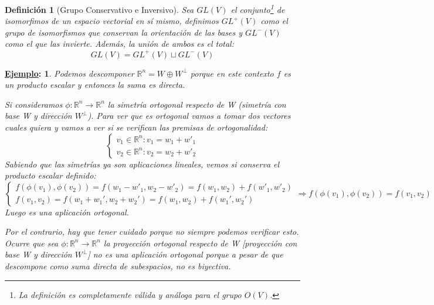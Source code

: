 \documentclass[10pt,a4paper,openright]{book}
\theoremstyle{break}
\newtheorem*{defi}{Definición}
\newtheorem*{ej}{\underline{Ejemplo}:}
\begin{document}
\begin{defi}[Grupo Conservativo e Inversivo]
Sea $GL(V)$ el conjunto\footnote{La definición es completamente válida y análoga para el grupo $O(V)$.} de isomorfimos de un espacio vectorial en sí mismo, definimos $GL^+(V)$ como el grupo de isomorfismos que conservan la orientación de las bases y $GL^-(V)$ como el que las invierte. Además, la unión de ambos es el total:
$$GL(V) = GL^+ (V) \sqcup GL^- (V)$$
\end{defi}

\begin{ej}
Podemos descomponer $\mathbb{R}^n = W \oplus W^\perp$ porque en este contexto $f$ es un producto escalar y entonces la suma es directa.

Si consideramos $\phi:\mathbb{R}^n  \to \mathbb{R}^n$ la simetría ortogonal respecto de W (simetría con base W y dirección $W^\perp$). Para ver que es ortogonal vamos a tomar dos vectores cuales quiera y vamos a ver si se verifican las premisas de ortogonalidad:
$$\begin{cases} v_1 \in \mathbb{R}^n : v_1 = w_1 + w'_1 \\ v_2 \in \mathbb{R}^n : v_2 = w_2 + w'_2 \end{cases}$$
Sabiendo que las simetrías ya son aplicaciones lineales, vemos si conserva el producto escalar definido:
$$\begin{cases} f(\phi(v_1), \phi(v_2)) = f( w_1 - w'_1,w_2 - w'_2) = f(w_1, w_2) + f(w'_1,w'_2) \\ f(v_1, v_2) = f(w_1+w_1', w_2+w_2') = f(w_1, w_2) + f(w_1', w_2') \end{cases}\Rightarrow f(\phi(v_1), \phi(v_2)) = f(v_1, v_2)$$
Luego es una aplicación ortogonal.

Por el contrario, hay que tener cuidado porque no siempre podemos verificar esto. Ocurre que sea $\phi:\mathbb{R}^n  \to \mathbb{R}^n$ la proyección ortogonal respecto de W [proyección con base W y dirección $W^\perp$] no es una aplicación ortogonal porque a pesar de que descompone como suma directa de subespacios, no es biyectiva.
\end{ej}
\end{document}
